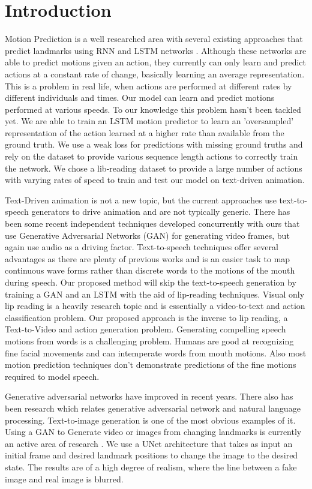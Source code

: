 \documentclass[10pt,twocolumn,letterpaper]{article}
\begin{document}
\section{Introduction}
 Motion Prediction is a well researched area with several existing approaches that predict landmarks using RNN and LSTM networks \cite{Authors16a,Authors16b,Authors16c}. Although these networks are able to predict motions given an action, they currently can only learn and predict actions at a constant rate of change, basically learning an average representation. This is a problem in real life, when actions are performed at different rates by different individuals and times. Our model can learn and predict motions performed at various speeds. To our knowledge this problem hasn't been tackled yet. We are able to train an LSTM motion predictor to learn an 'oversampled' representation of the action learned at a higher rate than available from the ground truth. We use a weak loss for predictions with missing ground truths and rely on the dataset to provide various sequence length actions to correctly train the network. We chose a lib-reading dataset to provide a large number of actions with varying rates of speed to train and test our model on text-driven animation.

 Text-Driven animation is not a new topic, but the current approaches use text-to-speech generators to drive animation and are not typically generic. There has been some recent independent techniques developed concurrently with ours that use Generative Adversarial Networks (GAN) for generating video frames, but again use audio as a driving factor. Text-to-speech techniques offer several advantages as there are plenty of previous works and is an easier task to map continuous wave forms rather than discrete words to the motions of the mouth during speech. Our proposed method will skip the text-to-speech generation by training a GAN and an LSTM with the aid of lip-reading techniques. Visual only lip reading is a heavily research topic and is essentially a video-to-text and action classification problem. Our proposed approach is the inverse to lip reading, a Text-to-Video and action generation problem. Generating compelling speech motions from words is a challenging problem. Humans are good at recognizing fine facial movements and can intemperate words from mouth motions. Also most motion prediction techniques don't demonstrate predictions of the fine motions required to model speech.

 Generative adversarial networks have improved in recent years. There also has been research which relates generative adversarial network and natural language processing. Text-to-image generation is one of the most obvious examples of it. Using a GAN to Generate video or images from changing landmarks is currently an active area of research \cite{Authors14a,Authors14b,Authors14c}. We use a UNet architecture that takes as input an initial frame and desired landmark positions to change the image to the desired state. The results are of a high degree of realism, where the line between a fake image and real image is blurred.
 
\end{document}
